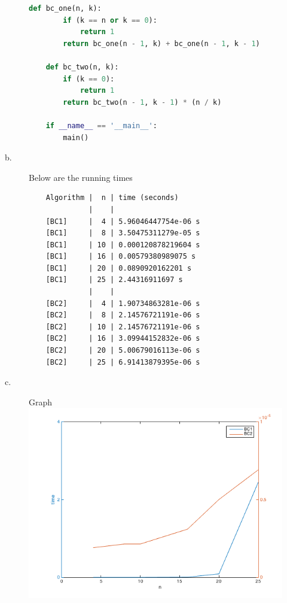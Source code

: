 \documentclass[paper=a4, fontsize=11pt]{scrartcl} %
\numberwithin{equation}{section} %
\numberwithin{figure}{section} %
\numberwithin{table}{section} %
\begin{document}
\begin{description}
\begin{description}
\begin{lstlisting}[language=Python]
    def bc_one(n, k):
        if (k == n or k == 0):
            return 1
        return bc_one(n - 1, k) + bc_one(n - 1, k - 1)
    
    def bc_two(n, k):
        if (k == 0):
            return 1
        return bc_two(n - 1, k - 1) * (n / k)
    
    if __name__ == '__main__':
        main()
    \end{lstlisting}


    \item[b.] Below are the running times \\
    \begin{lstlisting}
    Algorithm |  n | time (seconds)
              |    |
    [BC1]     |  4 | 5.96046447754e-06 s
    [BC1]     |  8 | 3.50475311279e-05 s
    [BC1]     | 10 | 0.000120878219604 s
    [BC1]     | 16 | 0.00579380989075 s
    [BC1]     | 20 | 0.0890920162201 s
    [BC1]     | 25 | 2.44316911697 s
              |    |
    [BC2]     |  4 | 1.90734863281e-06 s
    [BC2]     |  8 | 2.14576721191e-06 s
    [BC2]     | 10 | 2.14576721191e-06 s
    [BC2]     | 16 | 3.09944152832e-06 s
    [BC2]     | 20 | 5.00679016113e-06 s
    [BC2]     | 25 | 6.91413879395e-06 s
    \end{lstlisting}

    \item[c.] Graph \\
    \includegraphics[width=\textwidth]{hw2Fig}
    \end{description}
\end{description}

\end{document}
